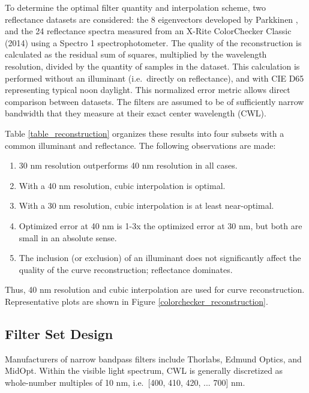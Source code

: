 \documentclass[twocolumn,10pt]{asme2ej}
\newcommand{\id}{\hspace{6 mm}}
\begin{document}
\id To determine the optimal filter quantity and interpolation scheme, two reflectance datasets are considered: the 8 eigenvectors developed by Parkkinen \cite{Parkkinen}, and the 24 reflectance spectra measured from an X-Rite ColorChecker Classic (2014) using a Spectro 1 spectrophotometer. The quality of the reconstruction is calculated as the residual sum of squares, multiplied by the wavelength resolution, divided by the quantity of samples in the dataset. This calculation is performed without an illuminant (i.e.\ directly on reflectance), and with CIE D65 representing typical noon daylight. This normalized error metric allows direct comparison between datasets. The filters are assumed to be of sufficiently narrow bandwidth that they measure at their exact center wavelength (CWL).

\id Table \ref{table_reconstruction} organizes these results into four subsets with a common illuminant and reflectance. The following observations are made:

\begin{enumerate}
  \item 30 nm resolution outperforms 40 nm resolution in all cases.
  \item With a 40 nm resolution, cubic interpolation is optimal.
  \item With a 30 nm resolution, cubic interpolation is at least near-optimal.
  \item Optimized error at 40 nm is 1-3x the optimized error at 30 nm, but both are small in an absolute sense.
  \item The inclusion (or exclusion) of an illuminant does not significantly affect the quality of the curve reconstruction; reflectance dominates.
\end{enumerate}

Thus, 40 nm resolution and cubic interpolation are used for curve reconstruction. Representative plots are shown in Figure \ref{colorchecker_reconstruction}.

\subsection{Filter Set Design}

\label{section_filters}

Manufacturers of narrow bandpass filters include Thorlabs, Edmund Optics, and MidOpt. Within the visible light spectrum, CWL is generally discretized as whole-number multiples of 10 nm, i.e.\ [400, 410, 420, ... 700] nm.
\end{document}
